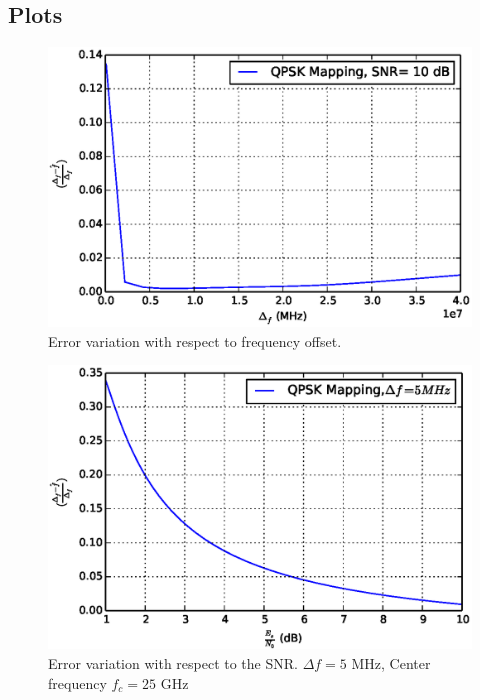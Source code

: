 \documentclass[journal,12pt,twocolumn]{IEEEtran}
\begin{document}
\subsection{Plots}
\begin{figure}
\begin{center}
\includegraphics[width=\columnwidth]{./figs/frequency_best.eps}
\end{center}
\caption{Error variation with respect to frequency offset.  }
\label{fig:freq_best}
\end{figure}
%
\begin{figure}
\begin{center}
\includegraphics[width=\columnwidth]{./figs/frequencyestiamtion_best_error_vs_snr.eps}
\end{center}
\caption{Error variation with respect to the SNR.  $\Delta f = 5$ MHz, Center frequency $f_c=25$ GHz}
\label{fig:freq_est}
\end{figure}
\end{document}
